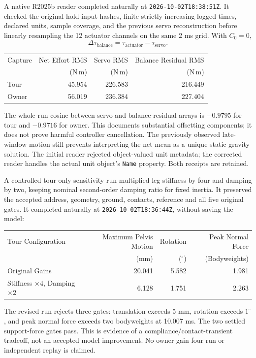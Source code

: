 \documentclass[11pt,a4paper]{article}
\begin{document}
A native R2025b reader completed naturally at
\texttt{2026-10-02T18:38:51Z}. It checked the original hold input hashes,
finite strictly increasing logged times, declared units, sample coverage,
and the previous servo reconstruction before linearly resampling the
12 actuator channels on the same 2 ms grid. With $C_0=0$,
\begin{equation}
 \Delta\tau_{\mathrm{balance}}=
 \tau_{\mathrm{actuator}}-\tau_{\mathrm{servo}}.
\end{equation}
\begin{center}
\begin{tabular}{lrrr}
\toprule
Capture & Net Effort RMS & Servo RMS & Balance Residual RMS \\
 & (N\,m) & (N\,m) & (N\,m) \\
\midrule
Tour & 45.954 & 226.583 & 216.449 \\
Owner & 56.019 & 236.384 & 227.404 \\
\bottomrule
\end{tabular}
\end{center}
The whole-run cosine between servo and balance-residual arrays is
$-0.9795$ for tour and $-0.9716$ for owner. This documents substantial
offsetting components; it does not prove harmful controller cancellation.
The previously observed late-window motion still prevents interpreting
the net mean as a unique static gravity solution. The initial reader
rejected object-valued unit metadata; the corrected reader handles the
actual unit object's \texttt{Name} property. Both receipts are retained.

A controlled tour-only sensitivity run multiplied leg stiffness by four
and damping by two, keeping nominal second-order damping ratio for fixed
inertia. It preserved the accepted address, geometry, ground, contacts,
reference and all five original gates. It completed naturally at
\texttt{2026-10-02T18:36:44Z}, without saving the model:
\begin{center}
\begin{tabular}{lrrr}
\toprule
Tour Configuration & Maximum Pelvis Motion & Rotation & Peak Normal Force \\
 & (mm) & ($^\circ$) & (Bodyweights) \\
\midrule
Original Gains & 20.041 & 5.582 & 1.981 \\
Stiffness $\times4$, Damping $\times2$ & 6.128 & 1.751 & 2.263 \\
\bottomrule
\end{tabular}
\end{center}
The revised run rejects three gates: translation exceeds 5 mm, rotation
exceeds $1^\circ$, and peak normal force exceeds two bodyweights at
10.007 ms. The two settled support-force gates pass. This is evidence of
a compliance/contact-transient tradeoff, not an accepted model improvement.
No owner gain-four run or independent replay is claimed.
\end{document}
